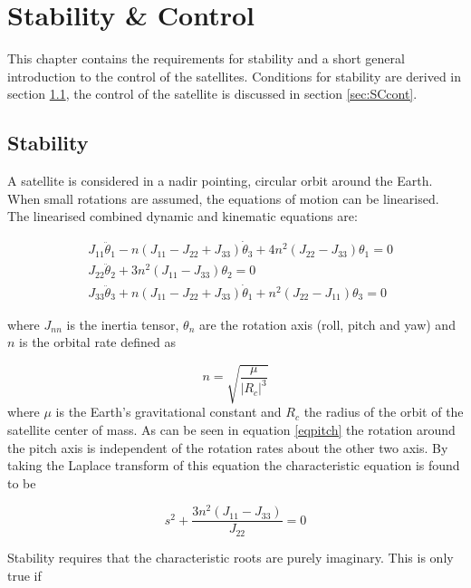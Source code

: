 \chapter{Stability \& Control}
\label{stabCont}
This chapter contains the requirements for stability and a short general introduction to the control of the satellites. Conditions for stability are derived in section \ref{sec:SCstab}, the control of the satellite is discussed in section \ref{sec:SCcont}.

\section{Stability}
\label{sec:SCstab}
A satellite is considered in a nadir pointing, circular orbit around the Earth. When small rotations are assumed, the equations of motion can be linearised. The linearised combined dynamic and kinematic equations are:

\begin{eqnarray}
&J_{11} \ddot{\theta}_1 - n\left(J_{11}-J_{22}+J_{33}\right) \dot{\theta}_3+ 4n^2\left(J_{22}-J_{33}\right)\theta _1= 0 \label{eqroll} \\
&J_{22} \ddot{\theta}_2 + 3n^2\left(J_{11}-J_{33}\right)\theta_2= 0 \label{eqpitch} \\
&J_{33} \ddot{\theta}_3 + n\left(J_{11}-J_{22}+J_{33}\right) \dot{\theta}_1 + n^2\left(J_{22}-J_{11}\right)\theta _3= 0 \label{eqyaw}
\end{eqnarray}

where $J_{nn}$ is the inertia tensor, $\theta_n$ are the rotation axis (roll, pitch and yaw) and $n$ is the orbital rate defined as 

\begin{equation}
n=\sqrt{\frac{\mu}{|R_c|^3}}
\label{orbrate}
\end{equation}
where $\mu$ is the Earth's gravitational constant and $R_c$ the radius of the orbit of the satellite center of mass. As can be seen in equation \ref{eqpitch} the rotation around the pitch axis is independent of the rotation rates about the other two axis. By taking the Laplace transform of this equation the characteristic equation is found to be

\begin{equation}
s^2+\frac{3n^2\left(J_{11}-J_{33}\right)}{J_{22}} = 0 
\label{lappitch}
\end{equation}

Stability requires that the characteristic roots are purely imaginary. This is only true if 

